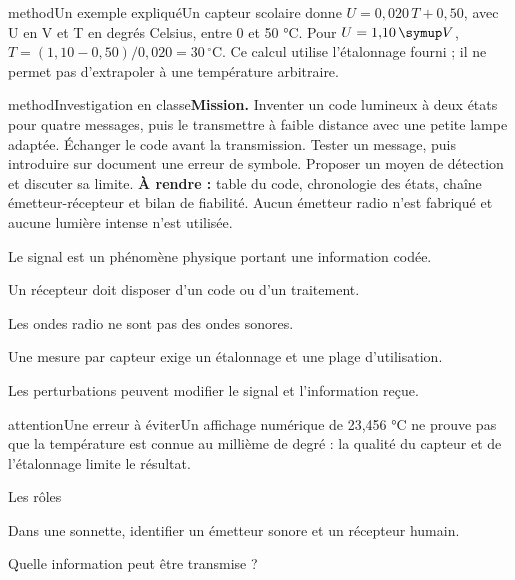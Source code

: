 \begin{pcEncadre}{method}{Un exemple expliqué}Un capteur scolaire donne $U=0{,}020\,T+0{,}50$, avec U en V et T en degrés Celsius, entre 0 et 50 °C. Pour $U=1{,}10\unite V$, $T=(1{,}10-0{,}50)/0{,}020=30\,^{\circ}\mathrm C$. Ce calcul utilise l’étalonnage fourni ; il ne permet pas d’extrapoler à une température arbitraire.\end{pcEncadre}
\label{activite-18}
\begin{pcEncadre}{method}{Investigation en classe}\textbf{Mission.} Inventer un code lumineux à deux états pour quatre messages, puis le transmettre à faible distance avec une petite lampe adaptée. Échanger le code avant la transmission. Tester un message, puis introduire sur document une erreur de symbole. Proposer un moyen de détection et discuter sa limite. \textbf{À rendre :} table du code, chronologie des états, chaîne émetteur-récepteur et bilan de fiabilité. Aucun émetteur radio n’est fabriqué et aucune lumière intense n’est utilisée.\end{pcEncadre}
\begin{questions}
\item Le signal est un phénomène physique portant une information codée.
\item Un récepteur doit disposer d’un code ou d’un traitement.
\item Les ondes radio ne sont pas des ondes sonores.
\item Une mesure par capteur exige un étalonnage et une plage d’utilisation.
\item Les perturbations peuvent modifier le signal et l’information reçue.
\end{questions}
\begin{pcEncadre}{attention}{Une erreur à éviter}Un affichage numérique de 23,456 °C ne prouve pas que la température est connue au millième de degré : la qualité du capteur et de l’étalonnage limite le résultat.\end{pcEncadre}
\pcGrille
\clearpage{}
\par\noindent\begin{minipage}{\linewidth}
\begin{exercice}[1]{Les rôles}
\begin{questions}
\item Dans une sonnette, identifier un émetteur sonore et un récepteur humain.
\item Quelle information peut être transmise ?
\end{questions}
\end{exercice}
\end{minipage}
